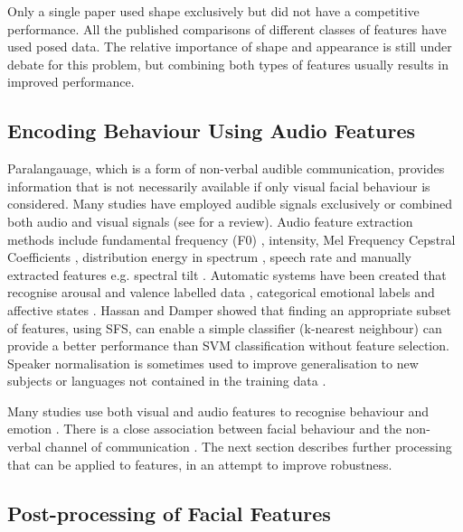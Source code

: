 Only a single paper used shape \featureGeneration exclusively but did not have a competitive performance. All the published comparisons of different classes of features have used posed data. The relative importance of shape and appearance is still under debate for this problem, but combining both types of features usually results in improved performance.

\subsection{Encoding Behaviour Using Audio Features}

Paralangauage, which is a form of non-verbal audible communication, provides information that is not necessarily available if only visual facial behaviour is considered. Many studies have employed audible signals exclusively or combined both audio and visual signals (see \cite{Schuller2011} for a review). Audio feature extraction methods include fundamental frequency (F0) \cite{Liscombe2003, Grimm2007}, intensity, Mel Frequency Cepstral Coefficients \cite{Grimm2007}, distribution energy in spectrum \cite{Truong2009}, speech rate \cite{Truong2009} and manually extracted features e.g. spectral tilt \cite{Liscombe2003}. Automatic systems have been created that recognise arousal and valence labelled data \cite{Truong2009}, categorical emotional labels \cite{Liscombe2003, Hassan2009} and affective states \cite{SobolShikler2010}. Hassan and Damper \cite{Hassan2009} showed that finding an appropriate subset of features, using \ac{SFS}, can enable a simple classifier (k-nearest neighbour) can provide a better performance than \ac{SVM} classification without feature selection. Speaker normalisation is sometimes used to improve generalisation to new subjects \cite{SobolShikler2010} or languages not contained in the training data \cite{SobolShikler2010, Hassan2012}.

Many studies use both visual and audio features to recognise behaviour and emotion \cite{Petridis2011, Kanluan2008, Haq2009}. There is a close association between facial behaviour and the non-verbal channel of communication \cite{Busso2007}. The next section describes further processing that can be applied to features, in an attempt to improve robustness.

\subsection{Post-processing of Facial Features}
\label{SectionPostProcessingFacialFeatures}

